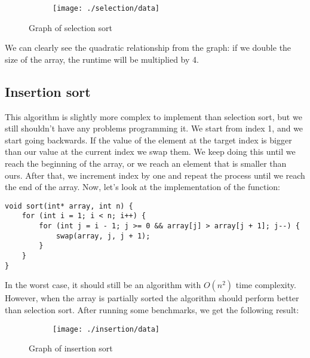 \documentclass[a4paper,11pt]{article}
\begin{document}
    \begin{figure}[h]
        \centering
        \begin{subfigure}[b]{.5\textwidth}
            \centering
            \texttt{[image: ./selection/data]} %
        \end{subfigure}
        \caption{Graph of selection sort}
        \label{fig:graph_1}
    \end{figure}

    We can clearly see the quadratic relationship from the graph: if we double the size of the array, the runtime will be multiplied by 4.

    \subsection*{Insertion sort}

    This algorithm is slightly more complex to implement than selection sort, but we still shouldn't have any problems programming it.
    We start from index 1, and we start going backwards.
    If the value of the element at the target index is bigger than our value at the current index we swap them.
    We keep doing this until we reach the beginning of the array, or we reach an element that is smaller than ours.
    After that, we increment index by one and repeat the process until we reach the end of the array.
    Now, let's look at the implementation of the function:

    \begin{verbatim}
void sort(int* array, int n) {
    for (int i = 1; i < n; i++) {
        for (int j = i - 1; j >= 0 && array[j] > array[j + 1]; j--) {
            swap(array, j, j + 1);
        }
    }
}
    \end{verbatim}
    In the worst case, it should still be an algorithm with $O(n^2)$ time complexity.
    However, when the array is partially sorted the algorithm should perform better than selection sort.
    After running some benchmarks, we get the following result:

    \begin{figure}[h]
        \centering
        \begin{subfigure}[b]{.5\textwidth}
            \centering
            \texttt{[image: ./insertion/data]} %
        \end{subfigure}
        \caption{Graph of insertion sort}
        \label{fig:graph_2}
    \end{figure}
\end{document}
